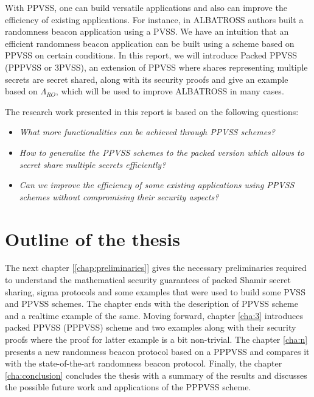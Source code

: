 With PPVSS, one can build versatile applications and also can improve the efficiency of existing 
applications. For instance, in ALBATROSS \cite{cryptoeprint:2020/644} authors built a randomness beacon application 
using a PVSS. We have an intuition that an efficient randomness beacon application can be built 
using a scheme based on PPVSS on certain conditions. In this report, we will introduce Packed PPVSS (PPPVSS or 3PVSS), 
an extension of PPVSS where shares representing multiple secrets are secret shared,  
along with its security proofs and give an example based on $\Lambda_{RO}$, which will be used to improve 
ALBATROSS in many cases.\par

The research work presented in this report is based on the following questions:
\begin{itemize}
    \item \textit{What more functionalities can be achieved through PPVSS schemes?}
    \item \textit{How to generalize the PPVSS schemes to the packed version which allows to 
      secret share multiple secrets efficiently?}
    \item \textit{Can we improve the efficiency of some existing applications using PPVSS schemes
      without compromising their security aspects?}
\end{itemize}


\section*{Outline of the thesis}
The next chapter [\ref{chap:preliminaries}] gives the necessary preliminaries required 
to understand the mathematical security guarantees of packed Shamir secret sharing, sigma 
protocols and some examples that were used to build some PVSS and PPVSS schemes. The chapter 
ends with the description of PPVSS scheme and a realtime example of the same. Moving forward, 
chapter \ref{cha:3} introduces packed PPVSS (PPPVSS) scheme and two examples along with 
their security proofs where the proof for latter example is a bit non-trivial. The 
chapter \ref{cha:n} presents a new randomness beacon protocol based on a PPPVSS and 
compares it with the state-of-the-art randomness beacon protocol.
Finally, the chapter \ref{cha:conclusion} concludes the thesis with a summary of the 
results and discusses the possible future work and applications of the PPPVSS scheme.


